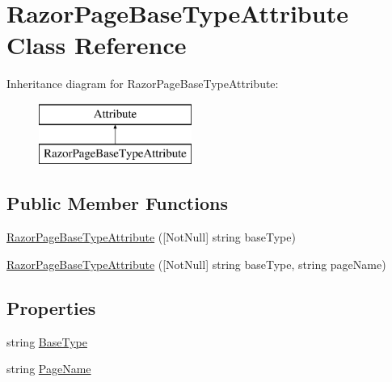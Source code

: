 \hypertarget{class_razor_page_base_type_attribute}{}\section{Razor\+Page\+Base\+Type\+Attribute Class Reference}
\label{class_razor_page_base_type_attribute}
Inheritance diagram for Razor\+Page\+Base\+Type\+Attribute\+:\begin{figure}[H]
\begin{center}
\leavevmode
\includegraphics[height=2.000000cm]{class_razor_page_base_type_attribute}
\end{center}
\end{figure}
\subsection*{Public Member Functions}
\begin{DoxyCompactItemize}
\item 
\mbox{\hyperlink{class_razor_page_base_type_attribute_a700557d8d2f37d58b462f5f6595722fc}{Razor\+Page\+Base\+Type\+Attribute}} (\mbox{[}Not\+Null\mbox{]} string base\+Type)
\item 
\mbox{\hyperlink{class_razor_page_base_type_attribute_af47671bb0e6b0757ab04c4bd103bd451}{Razor\+Page\+Base\+Type\+Attribute}} (\mbox{[}Not\+Null\mbox{]} string base\+Type, string page\+Name)
\end{DoxyCompactItemize}
\subsection*{Properties}
\begin{DoxyCompactItemize}
\item 
string \mbox{\hyperlink{class_razor_page_base_type_attribute_aaf0feca15cebb98e9a2bad8a63b36752}{Base\+Type}}
\item 
string \mbox{\hyperlink{class_razor_page_base_type_attribute_a500b4ebb0b487884268580694efa1d64}{Page\+Name}}
\end{DoxyCompactItemize}


